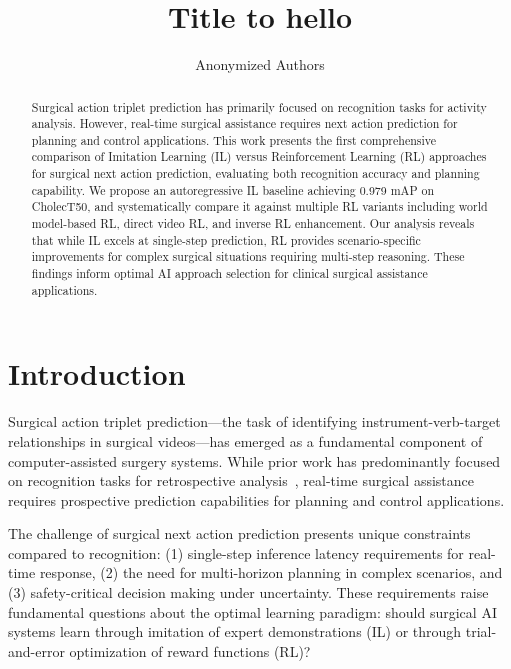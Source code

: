 \documentclass[runningheads]{llncs}
\author{Anonymized Authors}
\institute{Anonymized Affiliations \\
    \email{email@anonymized.com}}
\begin{document}
\title{Title to hello}

\maketitle

\begin{abstract}
Surgical action triplet prediction has primarily focused on recognition tasks for activity analysis. However, real-time surgical assistance requires next action prediction for planning and control applications. This work presents the first comprehensive comparison of Imitation Learning (IL) versus Reinforcement Learning (RL) approaches for surgical next action prediction, evaluating both recognition accuracy and planning capability. We propose an autoregressive IL baseline achieving 0.979 mAP on CholecT50, and systematically compare it against multiple RL variants including world model-based RL, direct video RL, and inverse RL enhancement. Our analysis reveals that while IL excels at single-step prediction, RL provides scenario-specific improvements for complex surgical situations requiring multi-step reasoning. These findings inform optimal AI approach selection for clinical surgical assistance applications.

\end{abstract}

\section{Introduction}

Surgical action triplet prediction—the task of identifying instrument-verb-target relationships in surgical videos—has emerged as a fundamental component of computer-assisted surgery systems. While prior work has predominantly focused on recognition tasks for retrospective analysis~\cite{ref_cholect50,ref_rendezvous}, real-time surgical assistance requires prospective prediction capabilities for planning and control applications.

The challenge of surgical next action prediction presents unique constraints compared to recognition: (1) single-step inference latency requirements for real-time response, (2) the need for multi-horizon planning in complex scenarios, and (3) safety-critical decision making under uncertainty. These requirements raise fundamental questions about the optimal learning paradigm: should surgical AI systems learn through imitation of expert demonstrations (IL) or through trial-and-error optimization of reward functions (RL)?
\end{document}
